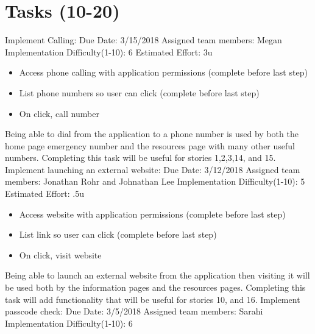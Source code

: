 \documentclass[letterpaper,12pt,titlepage]{article}
\begin{document}
\section{Tasks (10-20)}
Implement Calling:
\newline
Due Date: 3/15/2018
\newline
Assigned team members: Megan
\newline
Implementation Difficulty(1-10): 6
\newline
Estimated Effort: 3u
\begin{itemize}
\item Access phone calling with application permissions (complete before last step)
\item List phone numbers so user can click (complete before last step)
\item On click, call number
\end{itemize}
Being able to dial from the application to a phone number is used by both the home page emergency number and the resources page with many other useful numbers. Completing this task will be useful for stories 1,2,3,14, and 15.
\newline
\newline
Implement launching an external website:
\newline
Due Date: 3/12/2018 
\newline
Assigned team members: Jonathan Rohr and Johnathan Lee
\newline
Implementation Difficulty(1-10): 5
\newline
Estimated Effort: .5u
\begin{itemize}
\item Access website with application permissions (complete before last step)
\item List link so user can click (complete before last step)
\item On click, visit website
\end{itemize}
Being able to launch an external website from the application then visiting it will be used both by the information pages and the resources pages. Completing this task will add functionality that will be useful for stories 10, and 16.
\newline
\newline
Implement passcode check:
\newline
Due Date: 3/5/2018
\newline
Assigned team members: Sarahi
\newline
Implementation Difficulty(1-10): 6
\end{document}
